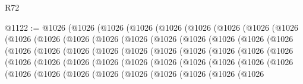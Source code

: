 \begin{lexlean}{R72}
\begin{coremodule}
@1122 := @1026
    (@1026
      (@1026
        (@1026
          (@1026
            (@1026
              (@1026
                (@1026
                  (@1026
                    (@1026
                      (@1026
                        (@1026
                          (@1026
                            (@1026
                              (@1026
                                (@1026
                                  (@1026
                                    (@1026
                                      (@1026
                                        (@1026
                                          (@1026
                                            (@1026
                                              (@1026
                                                (@1026
                                                  (@1026
                                                    (@1026
                                                      (@1026
                                                        (@1026
                                                          (@1026
                                                            (@1026
                                                              (@1026
                                                                (@1026
                                                                  (@1026
                                                                    (@1026
                                                                      (@1026
                                                                        (@1026
                                                                          (@1026
                                                                            (@1026
                                                                              (@1026
                                                                                (@1026
                                                                                  (@1026
                                                                                    (@1026
                                                                                      (@1026
                                                                                        (@1026
                                                                                          (@1026
                                                                                            (@1026
                                                                                              (@1026
                                                                                                (@1026

\end{coremodule}
\end{lexlean}
